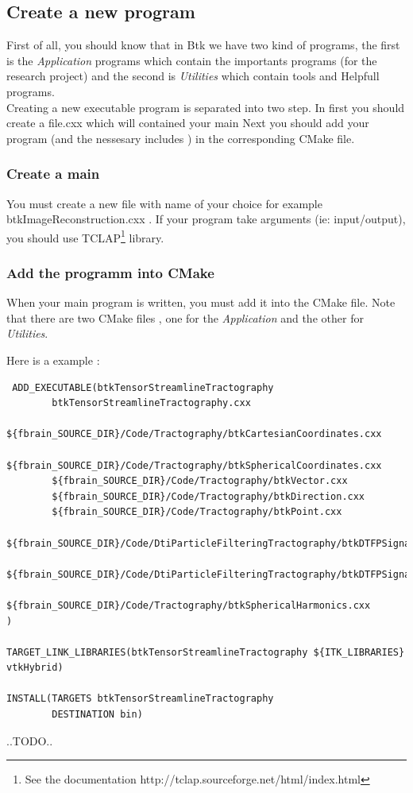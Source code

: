      

\subsection{Create a new program}
First of all, you should know that in Btk we have two kind of programs, the first is the \textit{Application} programs which contain the importants programs (for the research project)
and the second is \textit{Utilities} which contain tools and Helpfull programs.\\
Creating a new executable program is separated into two step.
In first you should create a file.cxx which will contained your main
Next you should add your program (and the nessesary includes ) in the corresponding CMake file.\\

\subsubsection{Create a main}
You must create a new file with name of your choice for example btkImageReconstruction.cxx .
If your program take arguments (ie: input/output), you should use TCLAP\footnote{See the documentation http://tclap.sourceforge.net/html/index.html } library.
\subsubsection{Add the programm into CMake}
When your main program is written, you must add it into the CMake file.
Note that there are two CMake files , one for the \textit{Application} and the other for \textit{Utilities}.

Here is a example :
\begin{verbatim}
 ADD_EXECUTABLE(btkTensorStreamlineTractography
        btkTensorStreamlineTractography.cxx
        ${fbrain_SOURCE_DIR}/Code/Tractography/btkCartesianCoordinates.cxx
        ${fbrain_SOURCE_DIR}/Code/Tractography/btkSphericalCoordinates.cxx
        ${fbrain_SOURCE_DIR}/Code/Tractography/btkVector.cxx
        ${fbrain_SOURCE_DIR}/Code/Tractography/btkDirection.cxx
        ${fbrain_SOURCE_DIR}/Code/Tractography/btkPoint.cxx
        ${fbrain_SOURCE_DIR}/Code/DtiParticleFilteringTractography/btkDTFPSignalExtractor.cxx
        ${fbrain_SOURCE_DIR}/Code/DtiParticleFilteringTractography/btkDTFPSignal.cxx
        ${fbrain_SOURCE_DIR}/Code/Tractography/btkSphericalHarmonics.cxx
)

TARGET_LINK_LIBRARIES(btkTensorStreamlineTractography ${ITK_LIBRARIES} vtkHybrid)

INSTALL(TARGETS btkTensorStreamlineTractography
        DESTINATION bin)
\end{verbatim}


..TODO..
